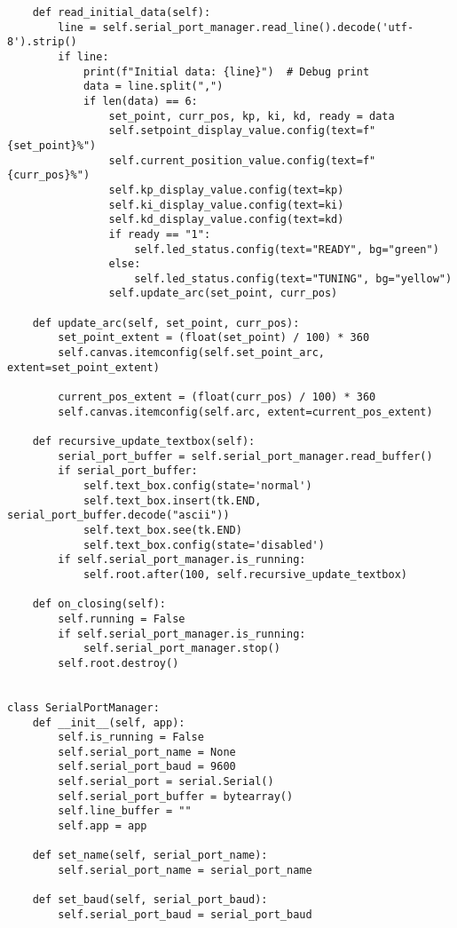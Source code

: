 \documentclass{article}
\begin{document}
\begin{verbatim}
    def read_initial_data(self):
        line = self.serial_port_manager.read_line().decode('utf-8').strip()
        if line:
            print(f"Initial data: {line}")  # Debug print
            data = line.split(",")
            if len(data) == 6:
                set_point, curr_pos, kp, ki, kd, ready = data
                self.setpoint_display_value.config(text=f"{set_point}%")
                self.current_position_value.config(text=f"{curr_pos}%")
                self.kp_display_value.config(text=kp)
                self.ki_display_value.config(text=ki)
                self.kd_display_value.config(text=kd)
                if ready == "1":
                    self.led_status.config(text="READY", bg="green")
                else:
                    self.led_status.config(text="TUNING", bg="yellow")
                self.update_arc(set_point, curr_pos)

    def update_arc(self, set_point, curr_pos):
        set_point_extent = (float(set_point) / 100) * 360
        self.canvas.itemconfig(self.set_point_arc, extent=set_point_extent)

        current_pos_extent = (float(curr_pos) / 100) * 360
        self.canvas.itemconfig(self.arc, extent=current_pos_extent)

    def recursive_update_textbox(self):
        serial_port_buffer = self.serial_port_manager.read_buffer()
        if serial_port_buffer:
            self.text_box.config(state='normal')
            self.text_box.insert(tk.END, serial_port_buffer.decode("ascii"))
            self.text_box.see(tk.END)
            self.text_box.config(state='disabled')
        if self.serial_port_manager.is_running:
            self.root.after(100, self.recursive_update_textbox)

    def on_closing(self):
        self.running = False
        if self.serial_port_manager.is_running:
            self.serial_port_manager.stop()
        self.root.destroy()


class SerialPortManager:
    def __init__(self, app):
        self.is_running = False
        self.serial_port_name = None
        self.serial_port_baud = 9600
        self.serial_port = serial.Serial()
        self.serial_port_buffer = bytearray()
        self.line_buffer = ""
        self.app = app

    def set_name(self, serial_port_name):
        self.serial_port_name = serial_port_name

    def set_baud(self, serial_port_baud):
        self.serial_port_baud = serial_port_baud


\end{verbatim}
\end{document}
